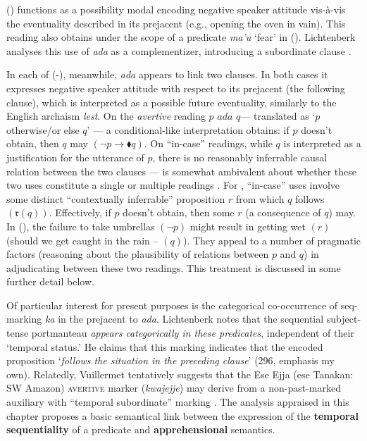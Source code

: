 () functions as a possibility modal encoding negative speaker attitude vis-à-vis the eventuality described in its prejacent (e.g., opening the oven in vain). This reading also obtains under the scope of a predicate \textit{ma'u} `fear' in (). Lichtenberk analyses this use of \textit{ada} as a complementizer, introducing a subordinate clause \citeyearpar[296]{Lichtenberk1995}. 

In each of (-), meanwhile, \textit{ada} appears to link two clauses. In both cases it expresses negative speaker attitude with respect to its prejacent (the following clause), which is interpreted as a possible future eventuality, similarly to the English archaism \textit{lest}. On the \textit{avertive} reading $ p \textit{ ada } q$--- translated as `$ p $ otherwise/or else $ q $' --- a condi\-tional-like interpretation obtains: if $ p $ doesn't obtain, then $ q $ may $ (\neg p \to\blacklozenge q) $. On ``in-case'' readings, while $ q $ is interpreted as a justification for the utterance of $ p $, there is no reasonably inferrable causal relation between the two clauses --- \citeauthor{Lichtenberk1995} is somewhat ambivalent about whether these two uses constitute a single or multiple readings \citeyearpar[298-302]{Lichtenberk1995}. For \citet{AnderBois2020}, ``in-case'' uses involve some distinct ``contextually inferrable'' proposition $ r $ from which $ q $ follows $ (\mathfrak{r}(q)) $. Effectively, if $ p$  doesn't obtain, then some $ r $ (a consequence of $ q $) may. In (), the failure to take umbrellas $( \neg p) $ might result in getting wet $ (r) $ (should we get caught in the rain -- $ (q) $). They appeal to a number of pragmatic factors (reasoning about the plausibility of relations between $ p $ and $ q $) in adjudicating between these two readings. This treatment is discussed in some further detail below.

 Of particular interest for present purposes is the categorical co-occurrence of {\sc seq}-marking \textit{ka} in the prejacent to \textit{ada}. Lichtenberk notes that the sequential subject-tense portmanteau \textit{appears categorically in these predicates}, independent of their `temporal status.' He claims that this marking indicates that the encoded proposition `\textit{follows the situation in the preceding clause}' (296, emphasis my own). Relatedly, Vuillermet tentatively suggests that the Ese Ejja (\gls{ese} Tanakan: SW Amazon) \textsc{avertive} marker (\textit{kwajejje}) may derive from a non-past-marked auxiliary with ``temporal subordinate'' marking \citeyearpar[281]{Vuillermet2018}. The analysis appraised in this chapter proposes a basic semantical link between the expression of the \textbf{temporal sequentiality} of a predicate and \textbf{apprehensional} semantics.



